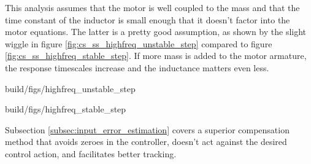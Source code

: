 This analysis assumes that the motor is well coupled to the mass and that the
time constant of the inductor is small enough that it doesn't factor into the
motor equations. The latter is a pretty good assumption, as shown by the slight
wiggle in figure \ref{fig:cs_ss_highfreq_unstable_step} compared to figure
\ref{fig:cs_ss_highfreq_stable_step}. If more mass is added to the motor
armature, the response timescales increase and the inductance matters even less.
\begin{bookfigure}
  \begin{minisvg}{2}{build/figs/highfreq_unstable_step}
    \caption{Step response of second-order DC brushed motor plant augmented with
      position ($L = 230$ μH)}
    \label{fig:cs_ss_highfreq_unstable_step}
  \end{minisvg}
  \hfill
  \begin{minisvg}{2}{build/figs/highfreq_stable_step}
    \caption{Step response of first-order DC brushed motor plant augmented with
      position}
    \label{fig:cs_ss_highfreq_stable_step}
  \end{minisvg}
\end{bookfigure}

Subsection \ref{subsec:input_error_estimation} covers a superior compensation
method that avoids zeroes in the \gls{controller}, doesn't act against the
desired control action, and facilitates better \gls{tracking}.
